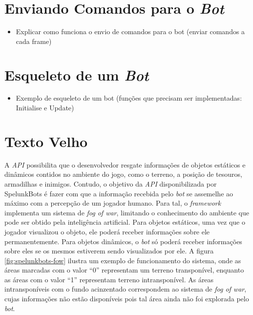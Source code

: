 \section{Enviando Comandos para o \textit{Bot}}
\begin{mdframed}[backgroundcolor=green!20]
\begin{itemize}
    \item
		Explicar como funciona o envio de comandos para o bot (enviar comandos a
		cada frame)
\end{itemize}
\end{mdframed}


\section{Esqueleto de um \textit{Bot}}
\begin{mdframed}[backgroundcolor=green!20]
\begin{itemize}
    \item
		Exemplo de esqueleto de um bot (funções que precisam ser implementadas:
		Initialise e Update)
\end{itemize}
\end{mdframed}


\section{Texto Velho}
A \textit{API} possibilita que o desenvolvedor resgate informações de objetos
estáticos e dinâmicos contidos no ambiente do jogo, como o terreno, a
posição de tesouros, armadilhas e inimigos. Contudo, o objetivo da \textit{API}
disponibilizada por SpelunkBots é fazer com que a informação recebida pelo
\textit{bot} se assemelhe ao máximo com a percepção de um jogador humano.  Para
tal, o \textit{framework} implementa um sistema de \textit{fog of war},
limitando o conhecimento do ambiente que pode ser obtido pela inteligência
artificial. Para objetos estáticos, uma vez que o jogador visualizou o objeto,
ele poderá receber informações sobre ele permanentemente. Para objetos
dinâmicos, o \textit{bot} só poderá receber informações sobre eles se os mesmos
estiverem sendo visualizados por ele. A figura \ref{fig:spelunkbots-fow} ilustra
um exemplo de funcionamento do sistema, onde as áreas marcadas com o valor ``0''
representam um terreno transponível, enquanto as áreas com o valor ``1''
representam terreno intransponível. As áreas intransponíveis com o fundo
acinzentado correspondem ao sistema de \textit{fog of war}, cujas informações
não estão disponíveis pois tal área ainda não foi explorada pelo \textit{bot}.

